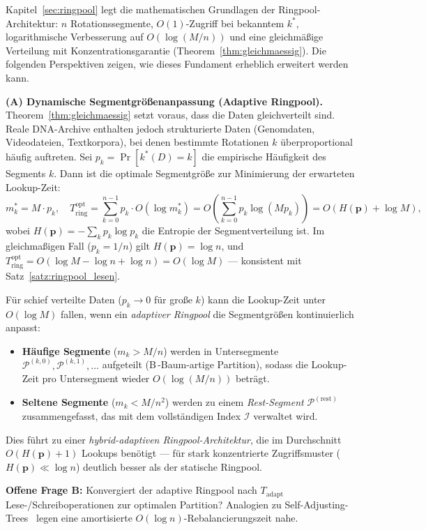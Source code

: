 ﻿\documentclass[a4paper,12pt]{article}
\theoremstyle{definition}
\theoremstyle{plain}
\begin{document}
Kapitel~\ref{sec:ringpool} legt die mathematischen Grundlagen der
Ringpool-Architektur: $n$ Rotationssegmente, $O(1)$-Zugriff bei
bekanntem $k^*$, logarithmische Verbesserung auf $O(\log(M/n))$ und
eine gleichmäßige Verteilung mit Konzentrations\-garantie
(Theorem~\ref{thm:gleichmaessig}).  Die folgenden Perspektiven zeigen,
wie dieses Fundament erheblich erweitert werden kann.

\textbf{(A) Dynamische Segmentgrößenanpassung (Adaptive Ringpool).}
Theorem~\ref{thm:gleichmaessig} setzt voraus, dass die Daten
gleichverteilt sind.  Reale DNA-Archive enthalten jedoch strukturierte
Daten (Genomdaten, Videodateien, Textkorpora), bei denen bestimmte
Rotationen $k$ überproportional häufig auftreten.  Sei
$p_k = \Pr[k^*(D) = k]$ die empirische Häufigkeit des Segments $k$.
Dann ist die optimale Segmentgröße zur Minimierung der erwarteten
Lookup-Zeit:
\[
  m_k^* = M \cdot p_k,
  \quad
  T_{\mathrm{ring}}^{\mathrm{opt}}
  = \sum_{k=0}^{n-1} p_k \cdot O(\log m_k^*)
  = O\!\left(\sum_{k=0}^{n-1} p_k \log(M p_k)\right)
  = O(H(\mathbf{p}) + \log M),
\]
wobei $H(\mathbf{p}) = -\sum_k p_k \log p_k$ die Entropie der
Segmentverteilung ist.  Im gleichma\-ßigen Fall ($p_k = 1/n$) gilt
$H(\mathbf{p}) = \log n$, und $T_{\mathrm{ring}}^{\mathrm{opt}}
= O(\log M - \log n + \log n) = O(\log M)$ --- konsistent mit
Satz~\ref{satz:ringpool_lesen}.

Für schief verteilte Daten ($p_k \to 0$ für große $k$) kann die
Lookup-Zeit unter $O(\log M)$ fallen, wenn ein \emph{adaptiver Ringpool}
die Segmentgrößen kontinuierlich anpasst:
\begin{itemize}
  \item \textbf{Häufige Segmente} ($m_k > M/n$) werden in Untersegmente
        $\mathcal{P}^{(k,0)}, \mathcal{P}^{(k,1)}, \ldots$ aufgeteilt
        (B\,-Baum-artige Partition), sodass die Lookup-Zeit pro
        Untersegment wieder $O(\log(M/n))$ beträgt.
  \item \textbf{Seltene Segmente} ($m_k < M/n^2$) werden zu einem
        \emph{Rest-Segment} $\mathcal{P}^{(\text{rest})}$ zusammengefasst,
        das mit dem vollständigen Index $\mathcal{I}$ verwaltet wird.
\end{itemize}
Dies führt zu einer \emph{hybrid-adaptiven Ringpool-Architektur}, die
im Durchschnitt $O(H(\mathbf{p}) + 1)$ Lookups benötigt --- für stark
konzentrierte Zugriffsmuster ($H(\mathbf{p}) \ll \log n$) deutlich
besser als der statische Ringpool.

\textbf{Offene Frage B:} Konvergiert der adaptive Ringpool nach
$T_{\mathrm{adapt}}$ Lese-/Schreiboperatio\-nen zur optimalen Partition?
Analogien zu Self-Adjusting-Trees~\cite{sleator1985} legen eine
amortisierte $O(\log n)$-Rebalancierungszeit nahe.
\end{document}
